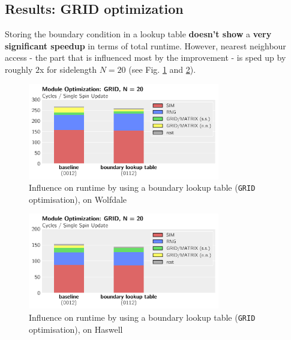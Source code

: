 \documentclass[letterpaper]{article}
\begin{document}
\subsection{Results: GRID optimization}
Storing the boundary condition in a lookup table \textbf{doesn't show} a \textbf{very significant speedup} in terms of total runtime. However, nearest neighbour access - the part that is influenced most by the improvement - is sped up by roughly $2$x for sidelength $N = 20$ (see Fig. \ref{GRID:Wolf:20} and \ref{GRID:Has:20}).
	\begin{figure}[h]\centering
	  \includegraphics[width = 8.36cm]{plots/msk_20_1.pdf}
	  \caption{Influence on runtime by using a boundary lookup table (\texttt{GRID} optimisation), on Wolfdale}
	  \label{GRID:Wolf:20}
	\end{figure}
	\begin{figure}[h]\centering
	  \includegraphics[width = 8.36cm]{plots/dg_20_1.pdf}
	  \caption{Influence on runtime by using a boundary lookup table (\texttt{GRID} optimisation), on Haswell}
	  \label{GRID:Has:20}
	\end{figure}
\end{document}
